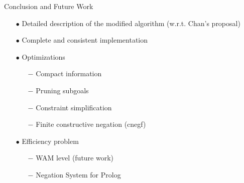 \documentclass[pdf,slideColor,contemporain]{prosper}
\begin{document}
\begin{slide}{Conclusion and Future Work}
\vspace{-0.3cm}
        \begin{itemize}

                \item[{\blue $\bullet$}] Detailed description of the
                modified {\blue algorithm} (w.r.t. Chan's proposal)

                \item[{\blue $\bullet$}] Complete and consistent
                {\blue implementation}

                \item[$\bullet$] {\blue Optimizations} 

                \begin{tiny}
                \begin{itemize}
                  \item[{\blue $-$}] Compact information
                  \item[{\blue $-$}] Pruning subgoals
                  \item[{\blue $-$}] Constraint simplification
                  \item[{\blue $-$}] Finite constructive negation (cnegf)
                 \end{itemize}
                 \end{tiny}

                \item[$\bullet$] {\blue Efficiency} problem

                \begin{tiny}
                  \begin{itemize}
                  \item[{\blue $-$}] WAM level (future work)
                  \item[{\blue $-$}] Negation System for Prolog 
                  \end{itemize}
                 \end{tiny}

        \end{itemize}
\end{slide}
\end{document}
